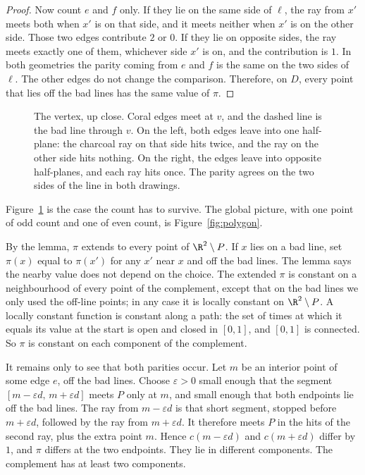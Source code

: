 \begin{proof}
Now count $e$ and $f$ only. If they lie on the same side of $\ell$, the ray from $x'$ meets both when $x'$ is on that side, and it meets neither when $x'$ is on the other side. Those two edges contribute $2$ or $0$. If they lie on opposite sides, the ray meets exactly one of them, whichever side $x'$ is on, and the contribution is $1$. In both geometries the parity coming from $e$ and $f$ is the same on the two sides of $\ell$. The other edges do not change the comparison. Therefore, on $D$, every point that lies off the bad lines has the same value of $\pi$.
\end{proof}

\begin{figure}[ht]
\centering
{}
\caption{The vertex, up close. Coral edges meet at $v$, and the dashed line is the bad line through $v$. On the left, both edges leave into one half-plane: the charcoal ray on that side hits twice, and the ray on the other side hits nothing. On the right, the edges leave into opposite half-planes, and each ray hits once. The parity agrees on the two sides of the line in both drawings.}
\label{fig:vertexparity}
\end{figure}

Figure~\ref{fig:vertexparity} is the case the count has to survive. The global picture, with one point of odd count and one of even count, is Figure~\ref{fig:polygon}.

By the lemma, $\pi$ extends to every point of $\R^2\setminus P$. If $x$ lies on a bad line, set $\pi(x)$ equal to $\pi(x')$ for any $x'$ near $x$ and off the bad lines. The lemma says the nearby value does not depend on the choice. The extended $\pi$ is constant on a neighbourhood of every point of the complement, except that on the bad lines we only used the off-line points; in any case it is locally constant on $\R^2\setminus P$. A locally constant function is constant along a path: the set of times at which it equals its value at the start is open and closed in $[0,1]$, and $[0,1]$ is connected. So $\pi$ is constant on each component of the complement.

It remains only to see that both parities occur. Let $m$ be an interior point of some edge $e$, off the bad lines. Choose $\varepsilon>0$ small enough that the segment $[m-\varepsilon d,\,m+\varepsilon d]$ meets $P$ only at $m$, and small enough that both endpoints lie off the bad lines. The ray from $m-\varepsilon d$ is that short segment, stopped before $m+\varepsilon d$, followed by the ray from $m+\varepsilon d$. It therefore meets $P$ in the hits of the second ray, plus the extra point $m$. Hence $c(m-\varepsilon d)$ and $c(m+\varepsilon d)$ differ by $1$, and $\pi$ differs at the two endpoints. They lie in different components. The complement has at least two components.

